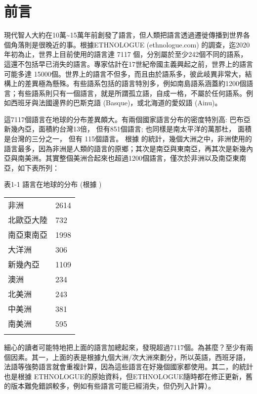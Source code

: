 \section{前言} 

現代智人大約在10萬{\textasciitilde}15萬年前創發了語言，但人類把語言透過遷徙傳播到世界各個角落則是很晚近的事。根據ETHNOLOGUE (ethnologue.com) 的調查，迄2020年初為止，世界上目前使用的語言達 7117 個，分別屬於至少242個不同的語系，這還不包括早已消失的語言。專家估計在17世紀帝國主義興起之前，世界上的語言可能多達 15000個。世界上的語言不但多，而且由於語系多，彼此岐異非常大，結構上的差異極為懸殊。有些語系包括的語言特別多，例如南島語系涵蓋約1200個語言；有些語系則只有一個語言，就是所謂孤立語，自成一格，不屬於任何語系。例如西班牙與法國邊界的巴斯克語 (Basque)，或北海道的愛奴語 (Ainu)。

這7117個語言在地球的分布差異頗大。有兩個國家語言分布的密度特別高: 巴布亞新幾內亞，面積約台灣13倍， 但有851個語言; 也同樣是南太平洋的萬那杜， 面積是台灣的三分之一， 但有 115個語言。 根據\citet{Nettle1999} 的統計，幾個大洲之中，非洲使用的語言最多，因為非洲是人類的語言的原鄉；其次是南亞與東南亞，再其次是新幾內亞與南美洲。其實整個美洲合起來也超過1200個語言，僅次於非洲以及南亞東南亞，如下表所列：                               

\begin{styleListParagraph}
表1-1  語言在地球的分布  (根據 \citet{Nettle1999})
\end{styleListParagraph}

\tablefirsthead{}

\tabletail{}
\tablelasttail{}
\begin{tabularx}{\textwidth}{XX}
\lsptoprule

非洲 & 2614\\
北歐亞大陸 & 732\\
南亞東南亞 & 1998\\
大洋洲 & 306\\
新幾內亞 & 1109\\
澳洲 & 234\\
北美洲 & 243\\
中美洲 & 381\\
南美洲 & 595\\
\lspbottomrule
\end{tabularx}
細心的讀者可能特地把上面的語言加總起來，發現超過7117個。為甚麼？至少有兩個因素。其一，上面的表是根據九個大洲/次大洲來劃分，所以英語，西班牙語，法語等強勢語言就會重複計算，因為這些語言在好幾個國家都使用。其二，\citet{Nettle1999}的統計也是根據 ETHNOLOGUE的原始資料，但ETHNOLOGUE隨時都在修正更新，舊的版本難免錯誤較多，例如有些語言可能已經消失，但仍列入計算）。

